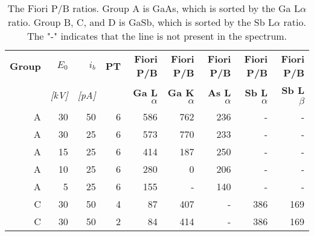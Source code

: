 \begin{table}[htbp]
    \begin{center}
        \caption{
            The Fiori P/B ratios.
            Group A is GaAs, which is sorted by the Ga L$\alpha$ ratio.
            Group B, C, and D is GaSb, which is sorted by the Sb L$\alpha$ ratio.
            The "-" indicates that the line is not present in the spectrum.
        }
        \label{tab:results:fiori}
        \begin{tabular}{rrrrrrrrr}
            \hline
            \textbf{Group} & \textbf{$E_0$} & \textbf{$i_b$} & \textbf{PT} & \textbf{Fiori P/B}    & \textbf{Fiori P/B}    & \textbf{Fiori P/B}    & \textbf{Fiori P/B}    & \textbf{Fiori P/B}   \\
            \emph{}        & \emph{[kV]}    & \emph{[pA]}    & \emph{}     & \textbf{Ga L$\alpha$} & \textbf{Ga K$\alpha$} & \textbf{As L$\alpha$} & \textbf{Sb L$\alpha$} & \textbf{Sb L$\beta$} \\
            \hline
            A              & 30             & 50             & 6           & 586                   & 762                   & 236                   & -                     & -                    \\
            A              & 30             & 25             & 6           & 573                   & 770                   & 233                   & -                     & -                    \\
            A              & 15             & 25             & 6           & 414                   & 187                   & 250                   & -                     & -                    \\
            A              & 10             & 25             & 6           & 280                   & 0                     & 206                   & -                     & -                    \\
            A              & 5              & 25             & 6           & 155                   & -                     & 140                   & -                     & -                    \\
            \hline
            C              & 30             & 50             & 4           & 87                    & 407                   & -                     & 386                   & 169                  \\
            C              & 30             & 50             & 2           & 84                    & 414                   & -                     & 386                   & 169                  \\

\end{tabular}
\end{center}
\end{table}

